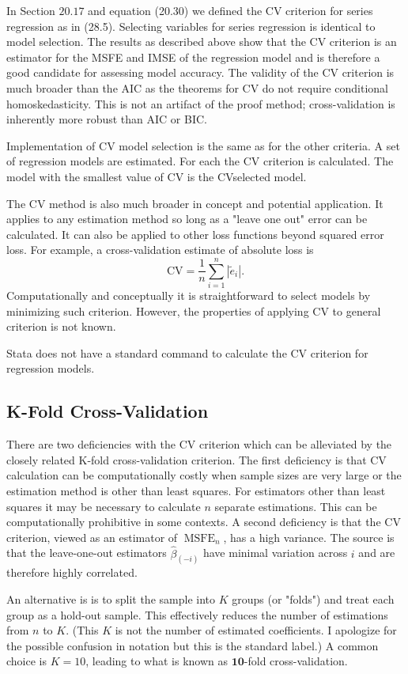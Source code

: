 \documentclass[10pt]{article}
\begin{document}
In Section $20.17$ and equation (20.30) we defined the CV criterion for series regression as in (28.5). Selecting variables for series regression is identical to model selection. The results as described above show that the CV criterion is an estimator for the MSFE and IMSE of the regression model and is therefore a good candidate for assessing model accuracy. The validity of the CV criterion is much broader than the AIC as the theorems for CV do not require conditional homoskedasticity. This is not an artifact of the proof method; cross-validation is inherently more robust than AIC or BIC.

Implementation of CV model selection is the same as for the other criteria. A set of regression models are estimated. For each the CV criterion is calculated. The model with the smallest value of CV is the CVselected model.

The CV method is also much broader in concept and potential application. It applies to any estimation method so long as a "leave one out" error can be calculated. It can also be applied to other loss functions beyond squared error loss. For example, a cross-validation estimate of absolute loss is
$$
\mathrm{CV}=\frac{1}{n} \sum_{i=1}^{n}\left|\widetilde{e}_{i}\right| .
$$
Computationally and conceptually it is straightforward to select models by minimizing such criterion. However, the properties of applying CV to general criterion is not known.

Stata does not have a standard command to calculate the CV criterion for regression models.

\subsection{K-Fold Cross-Validation}
There are two deficiencies with the CV criterion which can be alleviated by the closely related K-fold cross-validation criterion. The first deficiency is that CV calculation can be computationally costly when sample sizes are very large or the estimation method is other than least squares. For estimators other than least squares it may be necessary to calculate $n$ separate estimations. This can be computationally prohibitive in some contexts. A second deficiency is that the CV criterion, viewed as an estimator of $\operatorname{MSFE}_{n}$, has a high variance. The source is that the leave-one-out estimators $\widehat{\beta}_{(-i)}$ have minimal variation across $i$ and are therefore highly correlated.

An alternative is is to split the sample into $K$ groups (or "folds") and treat each group as a hold-out sample. This effectively reduces the number of estimations from $n$ to $K$. (This $K$ is not the number of estimated coefficients. I apologize for the possible confusion in notation but this is the standard label.) A common choice is $K=10$, leading to what is known as $\mathbf{1 0}$-fold cross-validation.
\end{document}
